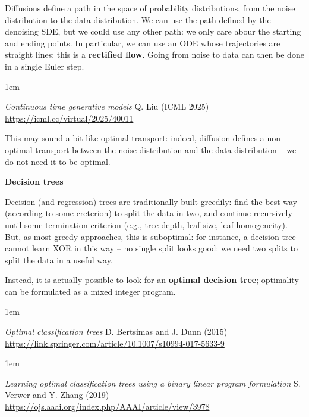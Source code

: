 \documentclass[a5paper]{article}
\let\d\textbf
\newenvironment{reference}{%
  \medskip\goodbreak
  \parskip 0pt
  \raggedright
  \leftskip 1em
  \obeylines
}{\par\medskip\goodbreak}
\def\section#1{\clearpage{\vspace*{0cm}\LARGE\centering\bfseries #1\par\bigskip\bigskip}}
\def\subsection#1{{\par\bigskip\goodbreak\large\bfseries #1\par}}
\begin{document}
Diffusions define a path in the space of probability distributions,
from the noise distribution to the data distribution. We can use the path
defined by the denoising SDE, but we could use any other path:
we only care abour the starting and ending points.
In particular, we can use an ODE whose trajectories are straight lines:
this is a \d{rectified flow}.
Going from noise to data can then be done in a single Euler step.

\begin{reference}
  \emph{Continuous time generative models}
  Q. Liu (ICML 2025)
  \url{https://icml.cc/virtual/2025/40011}
\end{reference}

This may sound a bit like optimal transport: indeed,
diffusion defines a non-optimal transport between the noise distribution and the data distribution --
we do not need it to be optimal.

\section{Other topics}
\subsection{Decision trees}

Decision (and regression) trees are traditionally built greedily:
find the best way (according to some creterion)
to split the data in two,
and continue recursively until some termination criterion (e.g., tree depth, leaf size, leaf homogeneity).
But, as most greedy approaches, this is suboptimal:
for instance, a decision tree cannot learn XOR in this way --
no single split looks good: we need two splits to split the data in a useful way.

Instead, it is actually possible to look for an \d{optimal decision tree};
optimality can be formulated as a mixed integer program.

\begin{reference}
  \emph{Optimal classification trees}
  D. Bertsimas and J. Dunn (2015)
  \url{https://link.springer.com/article/10.1007/s10994-017-5633-9}
\end{reference}

\begin{reference}
  \emph{Learning optimal classification trees  using a binary linear program formulation}
  S. Verwer and Y. Zhang (2019)
  \url{https://ojs.aaai.org/index.php/AAAI/article/view/3978}
\end{reference}
\end{document}
